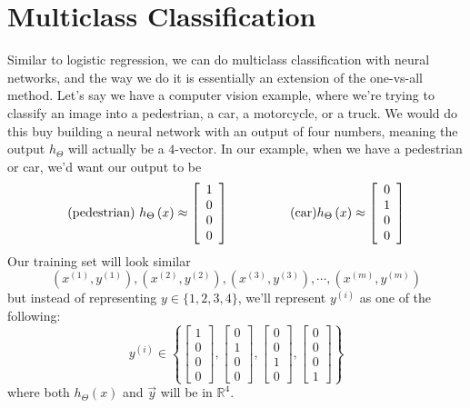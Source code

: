 \section{Multiclass Classification}
Similar to logistic regression, we can do multiclass classification with neural networks, and the way we do it is essentially an extension of the one-vs-all method. Let's say we have a computer vision example, where we're trying to classify an image into a pedestrian, a car, a motorcycle, or a truck. We would do this buy building a neural network with an output of four numbers, meaning the output $h_\Theta$ will actually be a $4$-vector. In our example, when we have a pedestrian or car, we'd want our output to be
$$
\text{(pedestrian) } h_\Theta\left(x\right) \approx \left[\begin{array}{c} 1 \\ 0 \\ 0 \\ 0 \end{array}\right] ~~\mbox{ \;\;\;\;\;\;\;\;\;\; }~~ \text{(car)} h_\Theta\left(x\right) \approx \left[\begin{array}{c} 0 \\ 1 \\ 0 \\ 0 \end{array}\right]
$$
Our training set will look similar
$$
\left(x^{(1)}, y^{(1)}\right), \left(x^{(2)}, y^{(2)}\right), \left(x^{(3)}, y^{(3)}\right), \cdots, \left(x^{(m)}, y^{(m)}\right)
$$
but instead of representing $y \in \{1, 2, 3, 4\}$, we'll represent $y^{(i)}$ as one of the following:
$$
y^{(i)} \in \left\{	 \left[\begin{array}{c} 1 \\ 0 \\ 0 \\ 0 \end{array}\right],  	\left[\begin{array}{c} 0 \\ 1 \\ 0 \\ 0 \end{array}\right],	 
			\left[\begin{array}{c} 0 \\ 0 \\ 1 \\ 0 \end{array}\right], 	 \left[\begin{array}{c} 0 \\ 0 \\ 0 \\ 1 \end{array}\right]		\right\}
$$
where both $h_\Theta\left(x\right)$ and $\vec{y}$ will be in $\mathbb{R}^4$. 

